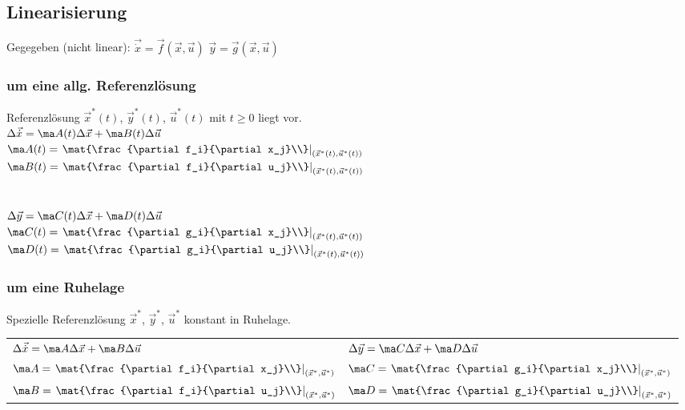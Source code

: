 \documentclass[german]{latex4ei/latex4ei_sheet}
\begin{document}
\begin{sectionbox}
	\subsection{Linearisierung}
	Gegegeben (nicht linear): \quad $\vec{\dot x} = \vec f(\vec x, \vec u)$ \qquad \quad $\vec y = \vec g(\vec x, \vec u)$
	\subsubsection{um eine allg. Referenzlösung}
	Referenzlösung $\vec x^*(t)$, $\vec y^*(t)$, $\vec u^*(t)$ mit $t \geq 0$ liegt vor. \\

	$\Delta \vec{\dot x} = \ma A(t) \Delta \vec x + \ma B(t) \Delta \vec u$\\
	$\ma A(t) = \left. \mat{\frac{\partial f_i}{\partial x_j}\\} \right|_{(\vec x^*(t),\vec u^*(t))}$ \quad
	$\ma B(t) = \left. \mat{\frac{\partial f_i}{\partial u_j}\\} \right|_{(\vec x^*(t),\vec u^*(t))}$\\ \\ \\
	$\Delta \vec y = \ma C(t) \Delta \vec x + \ma D(t) \Delta \vec u$\\
	$\ma C(t) = \left. \mat{\frac{\partial g_i}{\partial x_j}\\} \right|_{(\vec x^*(t),\vec u^*(t))}$ \quad
	$\ma D(t) = \left. \mat{\frac{\partial g_i}{\partial u_j}\\} \right|_{(\vec x^*(t),\vec u^*(t))}$\\

	\subsubsection{um eine Ruhelage}
	Spezielle Referenzlösung $\vec x^*$, $\vec y^*$, $\vec u^*$ konstant in Ruhelage.\\
	\begin{tabular}{ll}
	$\Delta \vec{\dot x} = \ma A \Delta \vec x + \ma B\Delta \vec u$ &  $\Delta \vec y = \ma C \Delta \vec x + \ma D\Delta \vec u$\\
	$\ma A = \left. \mat{\frac{\partial f_i}{\partial x_j}\\} \right|_{(\vec x^*,\vec u^*)}$ & $\ma C = \left. \mat{\frac{\partial g_i}{\partial x_j}\\} \right|_{(\vec x^*,\vec u^*)}$\\
	$\ma B = \left. \mat{\frac{\partial f_i}{\partial u_j}\\} \right|_{(\vec x^*,\vec u^*)}$ & $\ma D = \left. \mat{\frac{\partial g_i}{\partial u_j}\\} \right|_{(\vec x^*,\vec u^*)}$\\
	\end{tabular}
\end{sectionbox}
\end{document}
